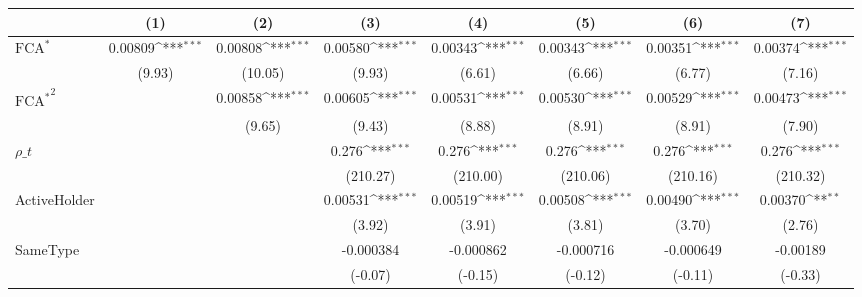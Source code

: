 {
\def\sym#1{\ifmmode^{#1}\else\(^{#1}\)\fi}
\begin{tabular}{l*{7}{c}}
\hline\hline
                    &\multicolumn{1}{c}{(1)}         &\multicolumn{1}{c}{(2)}         &\multicolumn{1}{c}{(3)}         &\multicolumn{1}{c}{(4)}         &\multicolumn{1}{c}{(5)}         &\multicolumn{1}{c}{(6)}         &\multicolumn{1}{c}{(7)}         \\
\hline
$ \text{FCA}^* $    &     0.00809\sym{***}&     0.00808\sym{***}&     0.00580\sym{***}&     0.00343\sym{***}&     0.00343\sym{***}&     0.00351\sym{***}&     0.00374\sym{***}\\
                    &      (9.93)         &     (10.05)         &      (9.93)         &      (6.61)         &      (6.66)         &      (6.77)         &      (7.16)         \\
[1em]
 $ { \text{FCA} ^ * } ^2 $&                     &     0.00858\sym{***}&     0.00605\sym{***}&     0.00531\sym{***}&     0.00530\sym{***}&     0.00529\sym{***}&     0.00473\sym{***}\\
                    &                     &      (9.65)         &      (9.43)         &      (8.88)         &      (8.91)         &      (8.91)         &      (7.90)         \\
[1em]
$ \rho\_t $          &                     &                     &       0.276\sym{***}&       0.276\sym{***}&       0.276\sym{***}&       0.276\sym{***}&       0.276\sym{***}\\
                    &                     &                     &    (210.27)         &    (210.00)         &    (210.06)         &    (210.16)         &    (210.32)         \\
[1em]
ActiveHolder        &                     &                     &     0.00531\sym{***}&     0.00519\sym{***}&     0.00508\sym{***}&     0.00490\sym{***}&     0.00370\sym{**} \\
                    &                     &                     &      (3.92)         &      (3.91)         &      (3.81)         &      (3.70)         &      (2.76)         \\
[1em]
SameType            &                     &                     &   -0.000384         &   -0.000862         &   -0.000716         &   -0.000649         &    -0.00189         \\
                    &                     &                     &     (-0.07)         &     (-0.15)         &     (-0.12)         &     (-0.11)         &     (-0.33)         \\

\end{tabular}}
